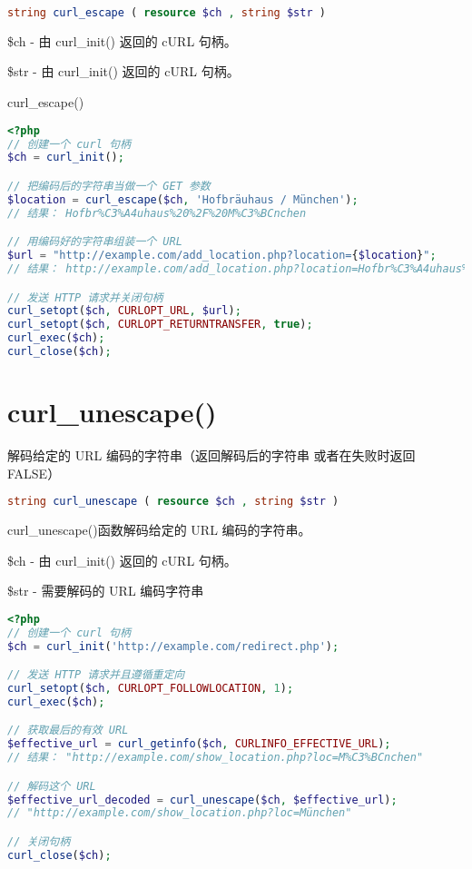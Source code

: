 \begin{lstlisting}[language=PHP]
string curl_escape ( resource $ch , string $str )
\end{lstlisting}



\begin{compactitem}
\item \$ch - 由 curl\_init() 返回的 cURL 句柄。
\item \$str - 由 curl\_init() 返回的 cURL 句柄。
\end{compactitem}




\begin{example}
curl\_escape()
\begin{lstlisting}[language=PHP]
<?php
// 创建一个 curl 句柄
$ch = curl_init();

// 把编码后的字符串当做一个 GET 参数
$location = curl_escape($ch, 'Hofbräuhaus / München');
// 结果： Hofbr%C3%A4uhaus%20%2F%20M%C3%BCnchen

// 用编码好的字符串组装一个 URL
$url = "http://example.com/add_location.php?location={$location}";
// 结果： http://example.com/add_location.php?location=Hofbr%C3%A4uhaus%20%2F%20M%C3%BCnchen

// 发送 HTTP 请求并关闭句柄
curl_setopt($ch, CURLOPT_URL, $url);
curl_setopt($ch, CURLOPT_RETURNTRANSFER, true);
curl_exec($ch);
curl_close($ch);
\end{lstlisting}
\end{example}

\section{curl\_unescape()}


解码给定的 URL 编码的字符串（返回解码后的字符串 或者在失败时返回 FALSE）

\begin{lstlisting}[language=PHP]
string curl_unescape ( resource $ch , string $str )
\end{lstlisting}

curl\_unescape()函数解码给定的 URL 编码的字符串。

\begin{compactitem}
\item \$ch - 由 curl\_init() 返回的 cURL 句柄。
\item \$str - 需要解码的 URL 编码字符串
\end{compactitem}

\begin{lstlisting}[language=PHP]
<?php
// 创建一个 curl 句柄
$ch = curl_init('http://example.com/redirect.php');

// 发送 HTTP 请求并且遵循重定向
curl_setopt($ch, CURLOPT_FOLLOWLOCATION, 1);
curl_exec($ch);

// 获取最后的有效 URL
$effective_url = curl_getinfo($ch, CURLINFO_EFFECTIVE_URL);
// 结果： "http://example.com/show_location.php?loc=M%C3%BCnchen"

// 解码这个 URL
$effective_url_decoded = curl_unescape($ch, $effective_url);
// "http://example.com/show_location.php?loc=München"

// 关闭句柄
curl_close($ch);
\end{lstlisting}

